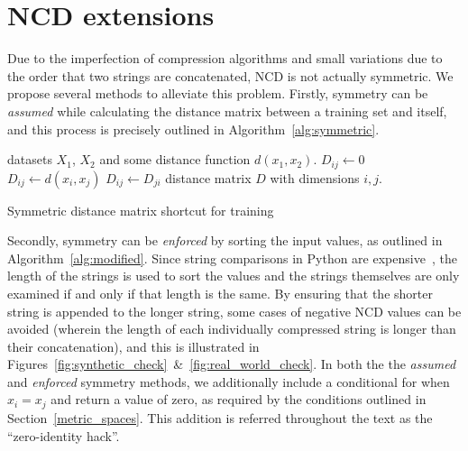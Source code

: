 \documentclass[conference]{IEEEtran}
\begin{document}
\section{NCD extensions}
\label{extensions}
Due to the imperfection of compression algorithms and small variations due to the order that two strings are concatenated, NCD is not actually symmetric. 
We propose several methods to alleviate this problem. 
Firstly, symmetry can be \textit{assumed} while calculating the distance matrix between a training set and itself, and this process is precisely outlined in Algorithm~\ref{alg:symmetric}. 

\begin{algorithm}
    \begin{algorithmic}
        \Require datasets $X_1$, $X_2$ and some distance function $d(x_1,x_2)$.
             
                 
                    \State $D_{ij} \gets 0$
                \Else
                    \State $D_{ij} \gets d(x_{i},x_{j})$
                \EndIf
                \State $D_{ij} \gets D_{ji}$ 
            \EndFor
        \EndFor
        \State \Return distance matrix $D$ with dimensions $i,j$.
    \end{algorithmic}
    \caption{Symmetric distance matrix shortcut for training}
    \label{alg:symmetric}
\end{algorithm}

Secondly, symmetry can be \textit{enforced} by sorting the input values, as outlined in Algorithm~\ref{alg:modified}. 
Since string comparisons in Python are expensive~\cite{}, the length of the strings is used to sort the values and the strings themselves are only examined if and only if that length is the same. 
By ensuring that the shorter string is appended to the longer string, some cases of negative NCD values can be avoided (wherein the length of each individually compressed string is longer than their concatenation), and this is illustrated in Figures~\ref{fig:synthetic_check}~\&~\ref{fig:real_world_check}. 
In both the the \textit{assumed} and \textit{enforced} symmetry methods, we additionally include a conditional for when $x_i = x_j$ and return a value of zero, as required by the conditions outlined in Section~\ref{metric_spaces}. 
This addition is referred throughout the text as the ``zero-identity hack''. 
\end{document}
